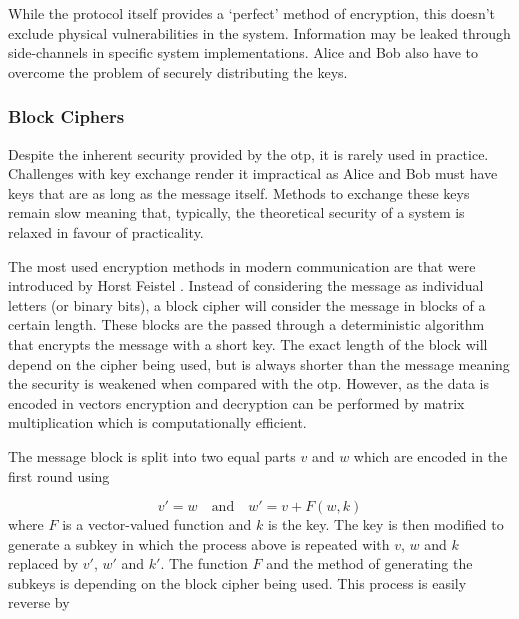 
While the protocol itself provides a `perfect' method of encryption, this doesn't exclude physical vulnerabilities in the system. Information may be leaked through side-channels in specific system implementations. Alice and Bob also have to overcome the problem of securely distributing the keys. 

\subsubsection{Block Ciphers}

Despite the inherent security provided by the \ac{otp}, it is rarely used in practice. Challenges with key exchange render it impractical as Alice and Bob must have keys that are as long as the message itself. Methods to exchange these keys remain slow meaning that, typically, the theoretical security of a system is relaxed in favour of practicality.

\begin{parahigh}
The most used encryption methods in modern communication are  that were introduced by Horst Feistel \cite{feistel1970cryptographic}. Instead of considering the message as individual letters (or binary bits), a block cipher will consider the message in blocks of a certain length. These blocks are the passed through a deterministic algorithm that encrypts the message with a short key. The exact length of the block will depend on the cipher being used, but is always shorter than the message meaning the security is weakened when compared with the \ac{otp}. However, as the data is encoded in vectors encryption and decryption can be performed by matrix multiplication which is computationally efficient.
\end{parahigh}

The message block is split into two equal parts $v$ and $w$ which are encoded in the first round using 

\begin{equation}
	v' = w \quad \text{and} \quad w' = v + F(w, k)
\end{equation}
where $F$ is a vector-valued function and $k$ is the key. The key is then modified to generate a subkey in which the process above is repeated with $v$, $w$ and $k$ replaced by $v'$, $w'$ and $k'$. The function $F$ and the method of generating the subkeys is depending on the block cipher being used. This process is easily reverse by

